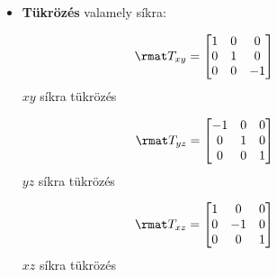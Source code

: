 \documentclass[a4paper, 12pt]{scrartcl}
\begin{document}
\begin{blueBox}
\begin{itemize}
\begin{multicols}{3}
            $$
              \rmat T_y = \begin{bmatrix}
                0 & 0 & 0 \\
                0 & 1 & 0 \\
                0 & 0 & 0
              \end{bmatrix}
              \phantom{= \rmat T_y}
            $$
            $y$-tengelyre tükrözés

            $$
              \rmat T_z = \begin{bmatrix}
                0 & 0 & 0 \\
                0 & 0 & 0 \\
                0 & 0 & 1
              \end{bmatrix}
              \phantom{= \rmat T_z}
            $$
            $z$-tengelyre tükrözés
          \end{multicols}
          \vspace{-3mm}

    \item \textbf{Tükrözés} valamely síkra:
          \vspace{-11mm}
          \begin{multicols}{3}
            \centering
            $$
              \rmat T_{xy} = \begin{bmatrix}
                1 & 0 & 0  \\
                0 & 1 & 0  \\
                0 & 0 & -1
              \end{bmatrix}
              \phantom{= \rmat T_{xy}}
            $$
            $xy$ síkra tükrözés

            $$
              \rmat T_{yz} = \begin{bmatrix}
                -1 & 0 & 0 \\
                0  & 1 & 0 \\
                0  & 0 & 1
              \end{bmatrix}
              \phantom{= \rmat T_{yz}}
            $$
            $yz$ síkra tükrözés

            $$
              \rmat T_{xz} = \begin{bmatrix}
                1 & 0  & 0 \\
                0 & -1 & 0 \\
                0 & 0  & 1
              \end{bmatrix}
              \phantom{= \rmat T_{xz}}
            $$
            $xz$ síkra tükrözés
          \end{multicols}
          \vspace{-3mm}


\end{itemize}
\end{blueBox}
\end{document}
